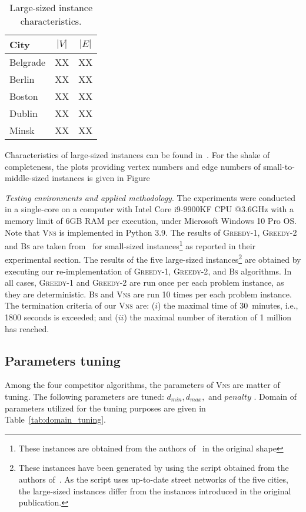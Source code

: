 \documentclass[sigconf]{acmart}
\begin{document}
 \begin{table}
 	\begin{tabular}{lcc}
 		\textbf{City}      & $|V|$ & $|E|$ \\ \hline
 		Belgrade  & XX    &   XX  \\ 
 		Berlin        & XX    &   XX \\
 	    Boston        & XX    &   XX \\
 	    Dublin        & XX    &   XX \\
 	    Minsk        & XX    &   XX \\ \hline
 	\end{tabular}
     \caption{Large-sized instance characteristics.}
          \label{tab:big_instances_chars}  
 \end{table}
 
 Characteristics of large-sized instances can be found in~\cite{corcoran2021heuristics}. For the shake of completeness, the plots providing vertex numbers and edge numbers of small-to-middle-sized instances is given in Figure  
 
 \emph{Testing environments and applied methodology}. The experiments were conducted in a single-core on a computer with Intel Core i9-9900KF CPU @3.6GHz with a memory limit of 6GB RAM per execution, under Microsoft Windows 10 Pro OS. Note that \textsc{Vns}  is implemented in Python 3.9. The results of \textsc{Greedy-1}, \textsc{Greedy-2} and \textsc{Bs} are taken from~\cite{corcoran2021heuristics} for small-sized instances\footnote{These instances are obtained from the authors of~\cite{corcoran2021heuristics} in the original shape} as reported in their experimental section. The results of the  five large-sized instances\footnote{These instances have been generated by using the script obtained from the authors of~\cite{corcoran2021heuristics}. As the script uses up-to-date street networks of the five cities, the large-sized instances differ from the instances introduced in the original publication. } are obtained by executing our re-implementation of \textsc{Greedy-1}, \textsc{Greedy-2}, and \textsc{Bs} algorithms. In all cases, \textsc{Greedy-1} and \textsc{Greedy-2} are run once per each problem instance, as they are deterministic. \textsc{Bs} and \textsc{Vns} are run 10 times per each problem instance.  The termination criteria of our \textsc{Vns} are: ($i$) the maximal time of 30~minutes, i.e., 1800 seconds is exceeded; and ($ii$) the maximal number of iteration of 1 million has reached. 
\subsection{Parameters tuning}
   Among the four competitor algorithms, the parameters of \textsc{Vns} are matter of tuning. The following parameters are tuned: $d_{min}, d_{max},$ and  $penalty$ . Domain of parameters utilized for the tuning purposes are given in Table~\ref{tab:domain_tuning}.
   
\end{document}
